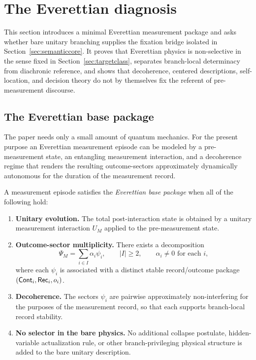 \section{The Everettian diagnosis}
\label{sec:branching}

This section introduces a minimal Everettian measurement package and asks whether bare unitary branching supplies the fixation bridge isolated in Section~\ref{sec:semanticcore}. It proves that Everettian physics is non-selective in the sense fixed in Section~\ref{sec:targetclass}, separates branch-local determinacy from diachronic reference, and shows that decoherence, centered descriptions, self-location, and decision theory do not by themselves fix the referent of pre-measurement discourse.

\subsection{The Everettian base package}

The paper needs only a small amount of quantum mechanics. For the present purpose an Everettian
measurement episode can be modeled by a pre-measurement state, an entangling measurement
interaction, and a decoherence regime that renders the resulting outcome-sectors approximately
dynamically autonomous for the duration of the measurement record.

\begin{definition}
\label{def:everett_base}
A measurement episode satisfies the \emph{Everettian base package} when all of the following hold:
\begin{enumerate}
    \item \textbf{Unitary evolution.} The total post-interaction state is obtained by a unitary measurement interaction $U_M$ applied to the pre-measurement state.
    \item \textbf{Outcome-sector multiplicity.} There exists a decomposition
    \[
    \Psi_M=\sum_{i\in I}\alpha_i\psi_i,
    \qquad |I|\ge 2,
    \qquad \alpha_i\neq 0 \text{ for each } i,
    \]
    where each $\psi_i$ is associated with a distinct stable record/outcome package $(\mathsf{Cont}_i,\mathsf{Rec}_i,o_i)$.
    \item \textbf{Decoherence.} The sectors $\psi_i$ are pairwise approximately non-interfering for the purposes of the measurement record, so that each supports branch-local record stability.
    \item \textbf{No selector in the bare physics.} No additional collapse postulate, hidden-variable actualization rule, or other branch-privileging physical structure is added to the bare unitary description.
\end{enumerate}
\end{definition}

